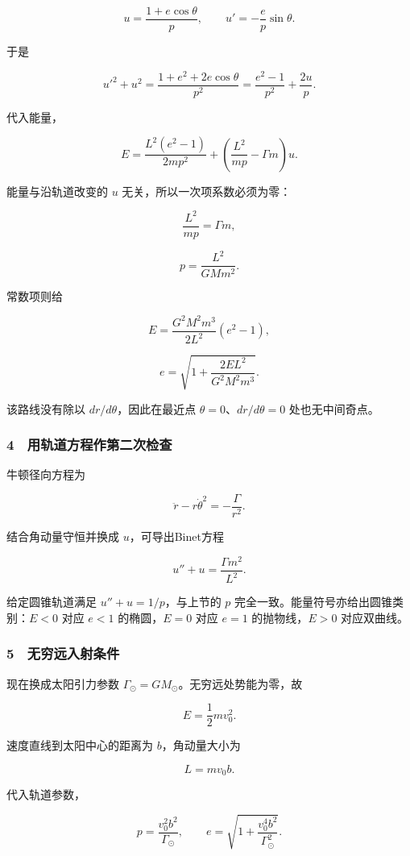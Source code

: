 \documentclass[12pt,a4paper,fontset=fandol]{ctexart}
\begin{document}
\[u=\frac{1+e\cos\theta}{p},
\qquad u'=-\frac e p\sin\theta.\]

于是

\[u'^2+u^2
=\frac{1+e^2+2e\cos\theta}{p^2}
=\frac{e^2-1}{p^2}+\frac{2u}{p}.\]

代入能量，

\[E=\frac{L^2(e^2-1)}{2mp^2}
+\left(\frac{L^2}{mp}-\Gamma m\right)u.\]

能量与沿轨道改变的 \(u\) 无关，所以一次项系数必须为零：

\[\frac{L^2}{mp}=\Gamma m,\]

\[\boxed{p=\frac{L^2}{GMm^2}.}\]

常数项则给

\[E=\frac{G^2M^2m^3}{2L^2}(e^2-1),\]

\[\boxed{e=\sqrt{1+\frac{2EL^2}{G^2M^2m^3}}.}\]

该路线没有除以 \(dr/d\theta\)，因此在最近点
\(\theta=0\)、\(dr/d\theta=0\) 处也无中间奇点。

\subsubsection{4　用轨道方程作第二次检查}\label{ux7528ux8f68ux9053ux65b9ux7a0bux4f5cux7b2cux4e8cux6b21ux68c0ux67e5}

牛顿径向方程为

\[\ddot r-r\dot\theta^2=-\frac\Gamma{r^2}.\]

结合角动量守恒并换成 \(u\)，可导出Binet方程

\[u''+u=\frac{\Gamma m^2}{L^2}.\]

给定圆锥轨道满足 \(u''+u=1/p\)，与上节的 \(p\)
完全一致。能量符号亦给出圆锥类别：\(E<0\) 对应 \(e<1\) 的椭圆，\(E=0\)
对应 \(e=1\) 的抛物线，\(E>0\) 对应双曲线。

\subsubsection{5　无穷远入射条件}\label{ux65e0ux7a77ux8fdcux5165ux5c04ux6761ux4ef6}

现在换成太阳引力参数 \(\Gamma_\odot=GM_\odot\)。无穷远处势能为零，故

\[\boxed{E=\frac12mv_0^2.}\]

速度直线到太阳中心的距离为 \(b\)，角动量大小为

\[\boxed{L=mv_0b.}\]

代入轨道参数，

\[\boxed{p=\frac{v_0^2b^2}{\Gamma_\odot},
\qquad e=\sqrt{1+\frac{v_0^4b^2}{\Gamma_\odot^2}}.}\]
\end{document}
